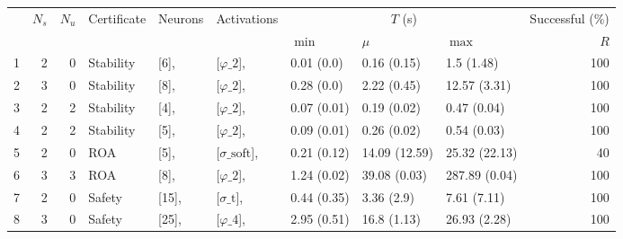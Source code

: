 \begin{tabular}{lrrllllllr}
    \toprule
       & $N_s$ & $N_u$ & Certificate & Neurons        & Activations                                                                          & \multicolumn{3}{c}{$T$ (s)} & Successful (\%)                        \\
       &       &       &             &                &                                                                                      & $\min$                      & $\mu$           & $\max$         & $R$ \\
    \midrule
    1  & 2     & 0     & Stability   & [6],           & [$\varphi\_{2}$],                                                                    & 0.01 (0.0)                  & 0.16 (0.15)     & 1.5 (1.48)     & 100 \\
    2  & 3     & 0     & Stability   & [8],           & [$\varphi\_{2}$],                                                                    & 0.28 (0.0)                  & 2.22 (0.45)     & 12.57 (3.31)   & 100 \\
    3  & 2     & 2     & Stability   & [4],           & [$\varphi\_{2}$],                                                                    & 0.07 (0.01)                 & 0.19 (0.02)     & 0.47 (0.04)    & 100 \\
    4  & 2     & 2     & Stability   & [5],           & [$\varphi\_{2}$],                                                                    & 0.09 (0.01)                 & 0.26 (0.02)     & 0.54 (0.03)    & 100 \\
    5  & 2     & 0     & ROA         & [5],           & [$\sigma\_{\mathrm{soft}}$],                                                         & 0.21 (0.12)                 & 14.09 (12.59)   & 25.32 (22.13)  & 40  \\
    6  & 3     & 3     & ROA         & [8],           & [$\varphi\_{2}$],                                                                    & 1.24 (0.02)                 & 39.08 (0.03)    & 287.89 (0.04)  & 100 \\
    7  & 2     & 0     & Safety      & [15],          & [$\sigma\_{\mathrm{t}}$],                                                            & 0.44 (0.35)                 & 3.36 (2.9)      & 7.61 (7.11)    & 100 \\
    8  & 3     & 0     & Safety      & [25],          & [$\varphi\_{4}$],                                                                    & 2.95 (0.51)                 & 16.8 (1.13)     & 26.93 (2.28)   & 100 \\

\end{tabular}

